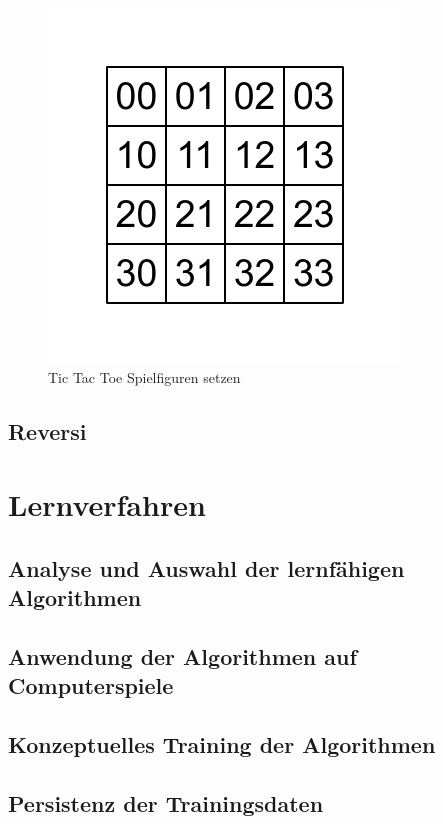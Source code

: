 \begin{figure}[!htbp]
  \centering
  \includegraphics[scale = 1]{inhalt/abbildungen/vier_mal_vier_matrix.pdf}
  \caption{Tic Tac Toe Spielfiguren setzen}
  \label{fig:kreiseUndKreuzeSetzen}
\end{figure}

\subsection{Reversi}

\section{Lernverfahren}
\label{sec:lernverfahren}
\subsection{Analyse und Auswahl der lernfähigen Algorithmen}

\subsection{Anwendung der Algorithmen auf Computerspiele}

\subsection{Konzeptuelles Training der Algorithmen}

\subsection{Persistenz der Trainingsdaten}